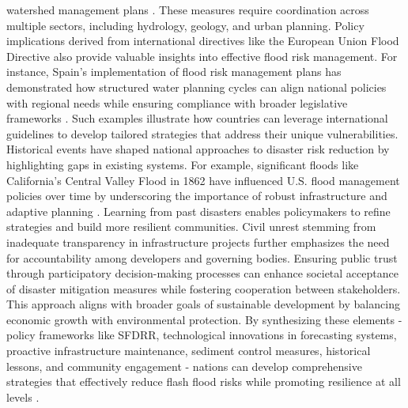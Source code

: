 watershed management plans \citep{Yang2022}. These measures require coordination across multiple sectors, including hydrology, geology, and urban planning. Policy implications derived from international directives like the European Union Flood Directive also provide valuable insights into effective flood risk management. For instance, Spain's implementation of flood risk management plans has demonstrated how structured water planning cycles can align national policies with regional needs while ensuring compliance with broader legislative frameworks \citep{Bodoque2019}. Such examples illustrate how countries can leverage international guidelines to develop tailored strategies that address their unique vulnerabilities. Historical events have shaped national approaches to disaster risk reduction by highlighting gaps in existing systems. For example, significant floods like California's Central Valley Flood in 1862 have influenced U.S. flood management policies over time by underscoring the importance of robust infrastructure and adaptive planning \citep{Abegaz2024}. Learning from past disasters enables policymakers to refine strategies and build more resilient communities. Civil unrest stemming from inadequate transparency in infrastructure projects further emphasizes the need for accountability among developers and governing bodies. Ensuring public trust through participatory decision-making processes can enhance societal acceptance of disaster mitigation measures while fostering cooperation between stakeholders. This approach aligns with broader goals of sustainable development by balancing economic growth with environmental protection. By synthesizing these elements - policy frameworks like SFDRR, technological innovations in forecasting systems, proactive infrastructure maintenance, sediment control measures, historical lessons, and community engagement - nations can develop comprehensive strategies that effectively reduce flash flood risks while promoting resilience at all levels \citep{Saad2024}\citep{Jubach2016}\citep{Munoz2018}.

